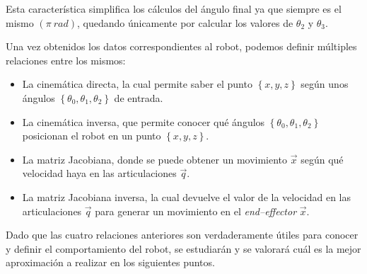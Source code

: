 Esta característica simplifica los cálculos del ángulo final ya que siempre es el mismo
$\left(\pi~rad\right)$, quedando únicamente por calcular los valores de $\theta_2$ y 
$\theta_3$.

Una vez obtenidos los datos correspondientes al robot, podemos definir múltiples 
relaciones entre los mismos:
\begin{itemize}
    \item La cinemática directa, la cual permite saber el punto $\left\{x, y, z\right\}$
          según unos ángulos $\left\{\theta_0, \theta_1, \theta_2\right\}$ de entrada.
    \item La cinemática inversa, que permite conocer qué ángulos 
          $\left\{\theta_0, \theta_1, \theta_2\right\}$ posicionan el robot en un punto
          $\left\{x, y, z\right\}$.
    \item La matriz Jacobiana, donde se puede obtener un movimiento $\overrightarrow{x}$ según 
          qué velocidad haya en las articulaciones $\overrightarrow{q}$.
    \item La matriz Jacobiana inversa, la cual devuelve el valor de la velocidad en
          las articulaciones $\overrightarrow{q}$ para generar un movimiento en el 
          \textit{end--effector} $\overrightarrow{x}$.
\end{itemize}

Dado que las cuatro relaciones anteriores son verdaderamente útiles para conocer y definir
el comportamiento del robot, se estudiarán y se valorará cuál es la mejor aproximación
a realizar en los siguientes puntos.
